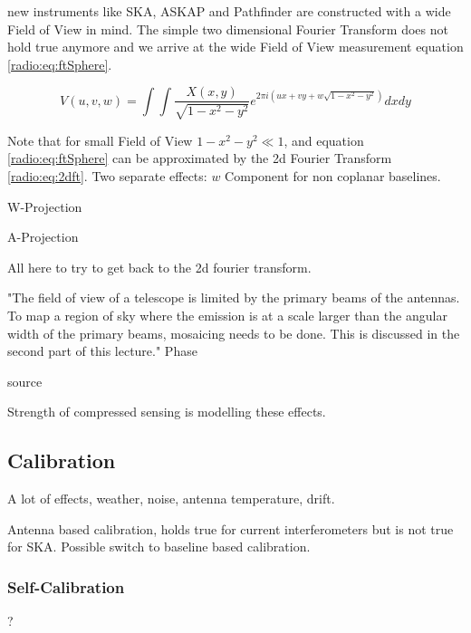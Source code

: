new instruments like SKA, ASKAP and Pathfinder are constructed with a wide Field of View in mind. The simple two dimensional Fourier Transform does not hold true anymore and we arrive at the wide Field of View measurement equation \eqref{radio:eq:ftSphere}.

\begin{equation}\label{radio:eq:ftSphere}
V(u, v, w) = \int\int \frac{X(x, y)}{\sqrt{1 - x^2 - y ^2}} e^{2 \pi i (ux+vy+ w\sqrt{1 - x^2 - y ^2})}dx dy
\end{equation}

Note that for small Field of View $1 - x^2 -y ^2 \ll 1$, and equation \eqref{radio:eq:ftSphere} can be approximated by the 2d Fourier Transform \eqref{radio:eq:2dft}. Two separate effects: $w$ Component for non coplanar baselines.

W-Projection \cite{cornwell2008noncoplanar}

A-Projection \cite{tasse2013applying}

All here to try to get back to the 2d fourier transform. 

"The field of view of a telescope is limited by the primary beams of the antennas. To map a region of sky where the emission is at a scale larger than the angular width of the primary beams, mosaicing needs to be done. This is discussed in the second part of this lecture."
Phase 

source \cite{lfraSchool}


Strength of compressed sensing is modelling these effects.

\subsection{Calibration}
A lot of effects, weather, noise, antenna temperature, drift.

Antenna based calibration, holds true for current interferometers but is not true for SKA. Possible switch to baseline based calibration.

\subsubsection{Self-Calibration}
?